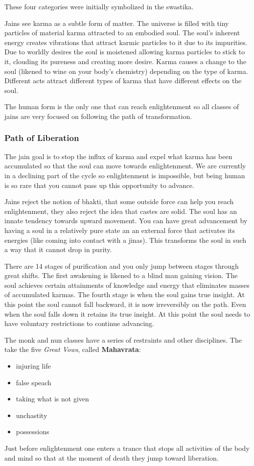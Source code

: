 \documentclass{article}
\begin{document}
These four categories were initially symbolized in the swastika.

Jains see karma as a subtle form of matter. The universe is filled with tiny particles of material karma attracted to an embodied soul. The soul's inherent energy creates vibrations that attract karmic particles to it due to its impurities. Due to worldly desires the soul is moistened allowing karma particles to stick to it, clouding its pureness and creating more desire. Karma causes a change to the soul (likened to wine on your body's chemistry) depending on the type of karma. Different acts attract different types of karma that have different effects on the soul.

The human form is the only one that can reach enlightenment so all classes of jains are very focused on following the path of transformation.

\subsubsection{Path of Liberation}
\label{ssub:path_of_liberation}
The jain goal is to stop the influx of karma and expel what karma has been accumulated so that the soul can move towards enlightenment. We are currently in a declining part of the cycle so enlightenment is impossible, but being human is so rare that you cannot pass up this opportunity to advance.

Jains reject the notion of bhakti, that some outside force can help you reach enlightenment, they also reject the idea that castes are solid. The soul has an innate tendency towards upward movement. You can have great advancement by having a soul in a relatively pure state an an external force that activates its energies (like coming into contact with a jinas). This transforms the soul in such a way that it cannot drop in purity.

There are 14 stages of purification and you only jump between stages through great shifts. The first awakening is likened to a blind man gaining vision. The soul achieves certain attainments of knowledge and energy that eliminates masses of accumulated karmas. The fourth stage is when the soul gains true insight. At this point the soul cannot fall backward, it is now irreversibly on the path. Even when the soul falls down it retains its true insight. At this point the soul needs to have voluntary restrictions to continue advancing.

The monk and nun classes have a series of restraints and other disciplines. The take the five \emph{Great Vows}, called \textbf{Mahavrata}:
\begin{itemize}
   	\item injuring life
   	\item false speach
   	\item taking what is not given
   	\item unchastity
   	\item possessions
\end{itemize}
Just before enlightenment one enters a trance that stops all activities of the body and mind so that at the moment of death they jump toward liberation.
\end{document}
